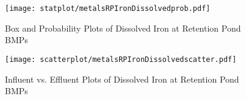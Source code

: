         \begin{figure}[hb]   %
            \centering
            \texttt{[image: statplot/metalsRPIronDissolvedprob.pdf]}
            \caption{Box and Probability Plots of Dissolved Iron at Retention Pond BMPs}
        \end{figure}         %
        
        
        \begin{figure}[hb]   %
            \centering
            \texttt{[image: scatterplot/metalsRPIronDissolvedscatter.pdf]}
            \caption{Influent vs. Effluent Plots of Dissolved Iron at Retention Pond BMPs}
        \end{figure}         %
        \clearpage
        